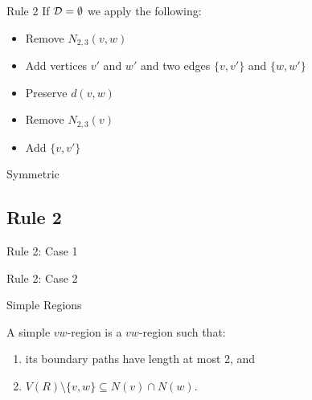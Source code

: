 \begin{frame}[c]{Rule 2}
    If $\mathbf{\mathcal{D} = \emptyset}$ we apply the following:

    \begin{caseof}

        \begin{itemize}
            \item Remove $N_{2,3}(v,w)$
            \item Add vertices $v'$ and $w'$ and two edges $\{v, v'\}$ and $\{w, w'\}$
            \item Preserve $d(v,w)$
        \end{itemize}
        \pause {}

        \begin{itemize}
            \item Remove $N_{2,3}(v)$
            \item Add $\{v, v'\}$
        \end{itemize}
        
        \pause {} Symmetric
    \end{caseof}
\end{frame}

\subsection{Rule 2}
\begin{frame}[2]{Rule 2: Case 1}
    \begin{figure}[!ht]
\end{figure}
\end{frame}

\begin{frame}[2]{Rule 2: Case 2}
    \begin{figure}[!ht]
\end{figure}
\end{frame}

\begin{frame}[c]{Simple Regions}

    \begin{tcolorbox}[colback=TUMBlueLighter,title=The Main Theorem]
        A simple $vw$-region is a $vw$-region such that:
        \begin{enumerate}
            \item its boundary paths have length at most 2, and
            \item $V(R) \setminus \{v,w\} \subseteq N(v) \cap N(w)$.
        \end{enumerate}
    \end{tcolorbox}

    \pause\begin{figure}[!ht]
    \end{figure}

\end{frame}

